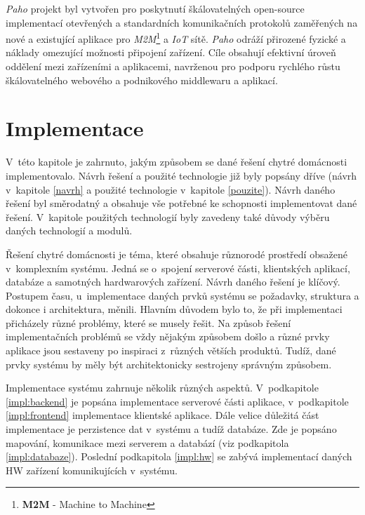 \emph{Paho} projekt byl vytvořen pro poskytnutí škálovatelných open-source implementací otevřených a standardních komunikačních protokolů zaměřených na nové a
existující aplikace pro \emph{M2M}\footnote{\textbf{M2M} - Machine to Machine} a \emph{IoT} sítě.
\emph{Paho} odráží přirozené fyzické a náklady omezující možnosti připojení zařízení.
Cíle obsahují efektivní úroveň oddělení mezi zařízeními a aplikacemi, navrženou pro podporu rychlého růstu škálovatelného webového a podnikového middlewaru a aplikací.\cite{paho:info}

\chapter{Implementace}
\label{impl}
V~této kapitole je zahrnuto, jakým způsobem se dané řešení chytré domácnosti implementovalo.
Návrh řešení a použité technologie již byly popsány dříve (návrh v~kapitole \ref{navrh} a použité technologie v~kapitole \ref{pouzite}).
Návrh daného řešení byl směrodatný a obsahuje vše potřebné ke schopnosti implementovat dané řešení.
V~kapitole použitých technologií byly zavedeny také důvody výběru daných technologií a modulů.

Řešení chytré domácnosti je téma, které obsahuje různorodé prostředí obsažené v~komplexním systému.
Jedná se o~spojení serverové části, klientských aplikací, databáze a samotných hardwarových zařízení.
Návrh daného řešení je klíčový.
Postupem času, u~implementace daných prvků systému se požadavky, struktura a dokonce i architektura, měnili.
Hlavním důvodem bylo to, že při implementaci přicházely různé problémy, které se musely řešit.
Na způsob řešení implementačních problémů se vždy nějakým způsobem došlo a různé prvky aplikace jsou sestaveny po inspiraci z~různých větších produktů.
Tudíž, dané prvky systému by měly být architektonicky sestrojeny správným způsobem.

Implementace systému zahrnuje několik různých aspektů.
V~podkapitole \ref{impl:backend} je popsána implementace serverové části aplikace, v~podkapitole \ref{impl:frontend} implementace klientské aplikace.
Dále velice důležitá část implementace je perzistence dat v~systému a tudíž databáze. Zde je popsáno mapování, komunikace mezi serverem a databází (viz podkapitola \ref{impl:databaze}).
Poslední podkapitola \ref{impl:hw} se zabývá implementací daných HW zařízení komunikujících v~systému.

